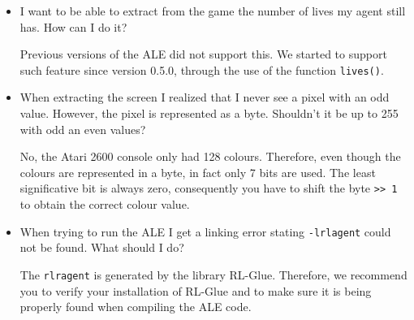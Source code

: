 \documentclass[12pt]{article}
\begin{document}
\begin{itemize}
\item I want to be able to extract from the game the number of lives my agent still has. How can I do it?

Previous versions of the ALE did not support this. We started to support such feature since version 
0.5.0, through the use of the function \verb+lives()+.

\item When extracting the screen I realized that I never see a pixel with an odd value. However,
the pixel is represented as a byte. Shouldn't it be up to 255 with odd an even values?

No, the Atari 2600 console only had 128 colours. Therefore, even though the colours are represented 
in a byte, in fact only 7 bits are used. The least significative bit is always zero, consequently you have
to shift the byte \verb+>> 1+ to obtain the correct colour value.

\item When trying to run the ALE I get a linking error stating \verb+-lrlagent+ could not be found.  
What should I do?

The \verb+rlragent+ is generated by the library RL-Glue. Therefore, we recommend you to verify your 
installation of RL-Glue and to make sure it is being properly found when compiling the ALE code.

\end{itemize}
\end{document}
